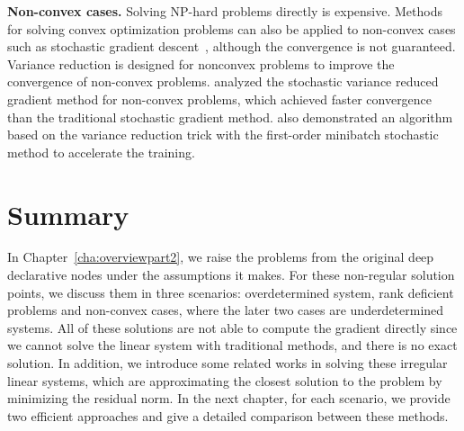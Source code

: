 \par \textbf{Non-convex cases.} Solving NP-hard problems directly is expensive. Methods for solving convex optimization problems can also be applied to non-convex cases such as stochastic gradient descent~\citep{RH:51}, although the convergence is not guaranteed. Variance reduction is designed for nonconvex problems to improve the convergence of non-convex problems. \cite{RS:16} analyzed the stochastic variance reduced gradient method for non-convex problems, which achieved faster convergence than the traditional stochastic gradient method. \cite{AZ:16} also demonstrated an algorithm based on the variance reduction trick with the first-order minibatch stochastic method to accelerate the training. 

\section{Summary}
In Chapter~\ref{cha:overviewpart2}, we raise the problems from the original deep declarative nodes under the assumptions it makes. For these non-regular solution points, we discuss them in three scenarios: overdetermined system, rank deficient problems and non-convex cases, where the later two cases are underdetermined systems. All of these solutions are not able to compute the gradient directly since we cannot solve the linear system with traditional methods, and there is no exact solution. In addition, we introduce some related works in solving these irregular linear systems, which are approximating the closest solution to the problem by minimizing the residual norm. In the next chapter, for each scenario, we provide two efficient approaches and give a detailed comparison between these methods. 
